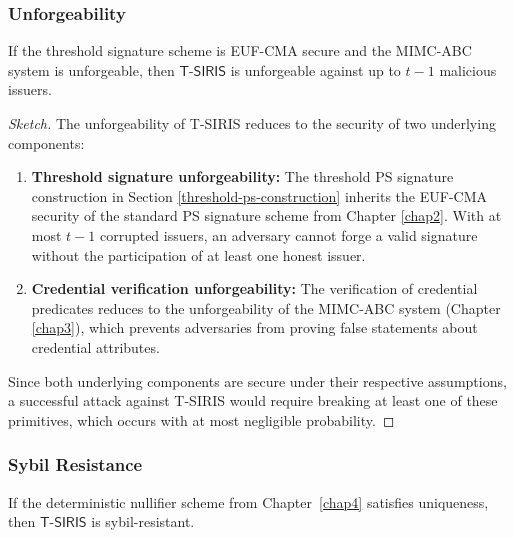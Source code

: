 \subsubsection{Unforgeability}

\begin{theorem}[Unforgeability]
If the threshold signature scheme is EUF-CMA secure and the MIMC-ABC system is unforgeable, then $\mathsf{T\text{-}SIRIS}$ is unforgeable against up to $t-1$ malicious issuers.
\end{theorem}

\begin{proof}[Sketch]
The unforgeability of T-SIRIS reduces to the security of two underlying components:

\begin{enumerate}
    \item \textbf{Threshold signature unforgeability:} The threshold PS signature construction in Section \ref{threshold-ps-construction} inherits the EUF-CMA security of the standard PS signature scheme from Chapter \ref{chap2}. With at most $t-1$ corrupted issuers, an adversary cannot forge a valid signature without the participation of at least one honest issuer.
    
    \item \textbf{Credential verification unforgeability:} The verification of credential predicates reduces to the unforgeability of the MIMC-ABC system (Chapter \ref{chap3}), which prevents adversaries from proving false statements about credential attributes.
\end{enumerate}

Since both underlying components are secure under their respective assumptions, a successful attack against T-SIRIS would require breaking at least one of these primitives, which occurs with at most negligible probability.
\end{proof}

\subsubsection{Sybil Resistance}

\begin{theorem}
If the deterministic nullifier scheme from Chapter~\ref{chap4} satisfies uniqueness, then $\mathsf{T\text{-}SIRIS}$ is sybil-resistant.
\end{theorem}

